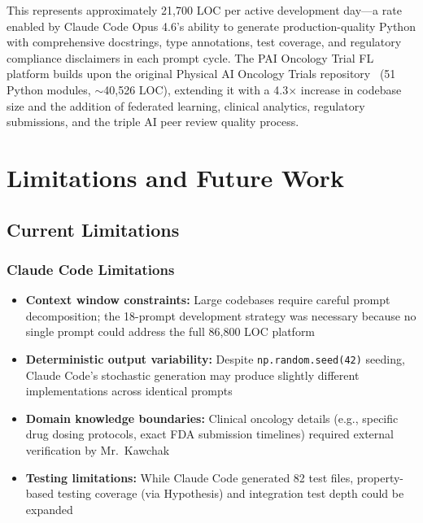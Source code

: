 \documentclass[10pt]{article}
\begin{document}
This represents approximately 21,700 LOC per active development day---a rate enabled by Claude Code Opus 4.6's ability to generate production-quality Python with comprehensive docstrings, type annotations, test coverage, and regulatory compliance disclaimers in each prompt cycle. The PAI Oncology Trial FL platform builds upon the original Physical AI Oncology Trials repository~\cite{kawchak2026physical} (51 Python modules, $\sim$40,526 LOC), extending it with a 4.3$\times$ increase in codebase size and the addition of federated learning, clinical analytics, regulatory submissions, and the triple AI peer review quality process.

\section{Limitations and Future Work}
\label{sec:limitations}

\subsection{Current Limitations}

\subsubsection{Claude Code Limitations}
\begin{itemize}
  \item \textbf{Context window constraints:} Large codebases require careful prompt decomposition; the 18-prompt development strategy was necessary because no single prompt could address the full 86,800 LOC platform
  \item \textbf{Deterministic output variability:} Despite \texttt{np.random.seed(42)} seeding, Claude Code's stochastic generation may produce slightly different implementations across identical prompts
  \item \textbf{Domain knowledge boundaries:} Clinical oncology details (e.g., specific drug dosing protocols, exact FDA submission timelines) required external verification by Mr.\ Kawchak
  \item \textbf{Testing limitations:} While Claude Code generated 82 test files, property-based testing coverage (via Hypothesis) and integration test depth could be expanded
\end{itemize}
\end{document}
